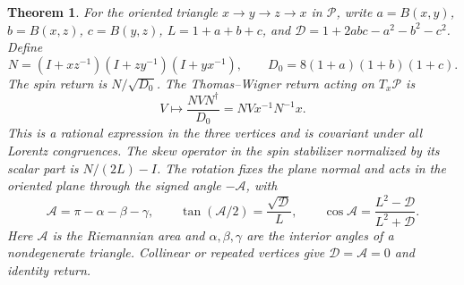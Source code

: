 \documentclass[11pt,reqno]{amsart}
\newtheorem{theorem}{Theorem}[section]
\theoremstyle{definition}
\theoremstyle{remark}
\numberwithin{equation}{section}
\begin{document}
\begin{theorem}\label{m3:triangle}
For the oriented triangle \(x\to y\to z\to x\) in \(\mathcal P\), write
\(a=B(x,y)\), \(b=B(x,z)\), \(c=B(y,z)\), \(L=1+a+b+c\), and
\(\mathcal D=1+2abc-a^2-b^2-c^2\). Define
\[
 N=(I+xz^{-1})(I+zy^{-1})(I+yx^{-1}),\qquad
 D_0=8(1+a)(1+b)(1+c).
\]
The spin return is \(N/\sqrt{D_0}\). The Thomas--Wigner return acting
on \(T_x\mathcal P\) is
\begin{equation}
 V\longmapsto \frac{NVN^\dagger}{D_0}
       = N V x^{-1}N^{-1}x .
 \label{m3:rational-rotation}
\end{equation}
This is a rational expression in the three vertices and is covariant
under all Lorentz congruences. The skew operator in the spin stabilizer
normalized by its scalar part is \(N/(2L)-I\). The rotation fixes
the plane normal and acts in the oriented plane through the signed
angle \(-\mathcal A\), with
\[
 \mathcal A=\pi-\alpha-\beta-\gamma,\qquad
 \tan(\mathcal A/2)=\frac{\sqrt{\mathcal D}}{L},\qquad
 \cos\mathcal A=\frac{L^2-\mathcal D}{L^2+\mathcal D}.
\]
Here \(\mathcal A\) is the Riemannian area and
\(\alpha,\beta,\gamma\) are the interior angles of a nondegenerate
triangle. Collinear or repeated vertices give \(\mathcal D=\mathcal A=0\)
and identity return.
\end{theorem}
\end{document}
